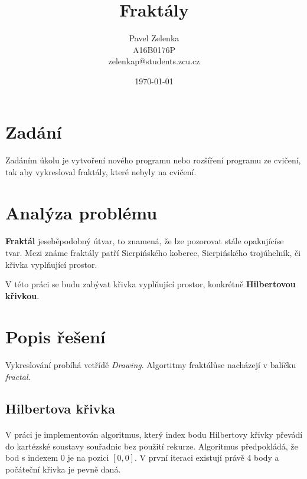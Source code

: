 \documentclass[12pt]{scrartcl}
\author{Pavel Zelenka\\A16B0176P\\zelenkap@students.zcu.cz}
\date{\today}
\title{Fraktály}
\begin{document}
\maketitle
{}
\newpage
{}
\newpage
\section{Zadání}
	
\paragraph{}
Zadáním úkolu je vytvoření nového programu nebo rozšíření programu ze cvičení, tak aby vykresloval fraktály, které nebyly na cvičení.

\section{Analýza problému}

\paragraph{}
\textbf{Fraktál} je\nobreakspace seběpodobný útvar, to znamená, že lze pozorovat stále opakující\nobreakspace se tvar. Mezi známe fraktály patří Sierpińského koberec, Sierpińského trojúhelník, či křivka vyplňující prostor.

V této práci se budu zabývat křivka vyplňující prostor, konkrétně \textbf{Hilbertovou křivkou}.

\section{Popis řešení}

\paragraph{}
Vykreslování probíhá ve\nobreakspace třídě \emph{Drawing}. Algortitmy fraktálů\nobreakspace se nacházejí v balíčku \emph{fractal}.

\subsection{Hilbertova křivka}
\paragraph{}
V práci je implementován algoritmus, který index bodu Hilbertovy křivky převádí do kartézské soustavy souřadnic bez použití rekurze. Algoritmus předpokládá, že bod s indexem $0$ je na pozici $[0,0]$. V první iteraci existují právě 4 body a počáteční křivka je pevně daná.
\end{document}

